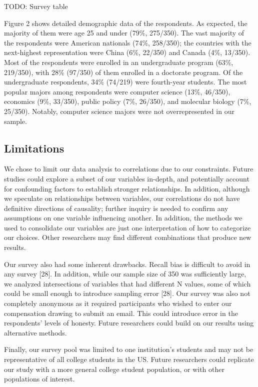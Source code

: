TODO: Survey table 

Figure 2 shows detailed demographic data of the respondents. As expected, the
majority of them were age 25 and under (79\%, 275/350). The vast majority of
the respondents were American nationals (74\%, 258/350); the countries with
the next-highest representation were China (6\%, 22/350) and Canada (4\%,
13/350). Most of the respondents were enrolled in an undergraduate
program (63\%, 219/350), with 28\% (97/350) of them enrolled in a doctorate
program. Of the undergraduate respondents, 34\% (74/219) were fourth-year
students. The most popular majors among respondents were computer science
(13\%, 46/350), economics (9\%, 33/350), public policy (7\%, 26/350), and
molecular biology (7\%, 25/350). Notably, computer science majors were not
overrepresented in our sample.



\subsection{Limitations}

We chose to limit our data
analysis to correlations due to our constraints. Future studies could explore
a subset of our variables in-depth, and potentially account for confounding
factors to establish stronger relationships. In addition, although we
speculate on relationships between variables, our correlations do not have
definitive directions of causality; further inquiry is needed to confirm any
assumptions on one variable influencing another. In addition, the methods we
used to consolidate our variables are just one interpretation of how to
categorize our choices. Other researchers may find different combinations that
produce new results.

Our survey also had some inherent drawbacks. Recall bias is difficult to avoid
in any survey [28]. In addition, while our sample size of 350 was sufficiently
large, we analyzed intersections of variables that had different N values,
some of which could be small enough to introduce sampling error [28]. Our
survey was also not completely anonymous as it required participants who
wished to enter our compensation drawing to submit an email. This could
introduce error in the respondents' levels of honesty. Future researchers
could build on our results using alternative methods.

Finally, our survey pool was limited to one institution's students and may not be representative of all college students in the US. Future researchers could replicate our study
with a more general college student population, or with other populations of
interest.
